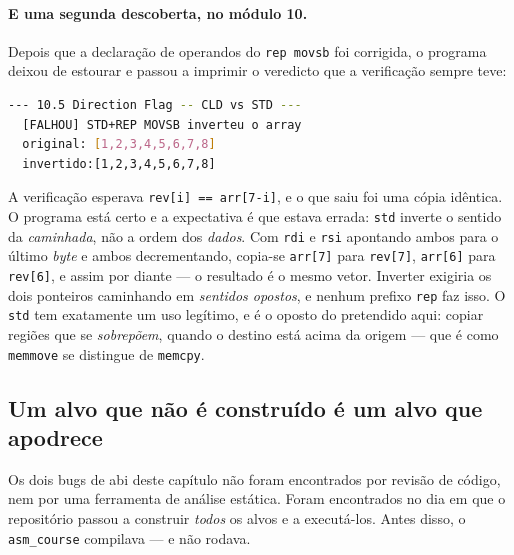 \paragraph{E uma segunda descoberta, no módulo 10.} Depois que a declaração de
operandos do \texttt{rep movsb} foi corrigida, o programa deixou de estourar e
passou a imprimir o veredicto que a verificação sempre teve:

\begin{lstlisting}[style=bt, language=bash,
    caption={Saída medida de \texttt{dist/bin/asm\_10\_string\_ops}, seção 10.5.}]
--- 10.5 Direction Flag -- CLD vs STD ---
  [FALHOU] STD+REP MOVSB inverteu o array
  original: [1,2,3,4,5,6,7,8]
  invertido:[1,2,3,4,5,6,7,8]
\end{lstlisting}

A verificação esperava \texttt{rev[i] == arr[7-i]}, e o que saiu foi uma cópia
idêntica. O programa está certo e a expectativa é que estava errada:
\texttt{std} inverte o sentido da \emph{caminhada}, não a ordem dos
\emph{dados}. Com \texttt{rdi} e \texttt{rsi} apontando ambos para o último
\emph{byte} e ambos decrementando, copia-se \texttt{arr[7]} para
\texttt{rev[7]}, \texttt{arr[6]} para \texttt{rev[6]}, e assim por diante --- o
resultado é o mesmo vetor. Inverter exigiria os dois ponteiros caminhando em
\emph{sentidos opostos}, e nenhum prefixo \texttt{rep} faz isso. O
\texttt{std} tem exatamente um uso legítimo, e é o oposto do pretendido aqui:
copiar regiões que se \emph{sobrepõem}, quando o destino está acima da origem
--- que é como \texttt{memmove} se distingue de \texttt{memcpy}.

\subsection{Um alvo que não é construído é um alvo que apodrece}
\label{sec:alvo-apodrece}

Os dois bugs de \gls{abi} deste capítulo não foram encontrados por revisão de
código, nem por uma ferramenta de análise estática. Foram encontrados no dia em
que o repositório passou a construir \emph{todos} os alvos e a executá-los.
Antes disso, o \texttt{asm\_course} compilava --- e não rodava.

